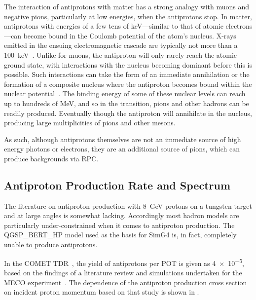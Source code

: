 %
The interaction of antiprotons with matter has a strong analogy with muons and negative pions, particularly at low energies, when the antiprotons stop.
In matter, antiprotons with energies of a few tens of keV---similar to that of atomic electrons---can become bound in the Coulomb potential of the atom's nucleus.
X-rays emitted in the ensuing electromagnetic cascade are typically not more than a 100~keV~\cite{Aramaki201352}.
Unlike for muons, the antiproton will only rarely reach the atomic ground state, with interactions with the nucleus becoming dominant before this is possible.
Such interactions can take the form of an immediate annihilation or the formation of a composite nucleus where the antiproton becomes bound within the nuclear potential~\cite{Wong:1984fy,Mishustin:2004xa}.
The binding energy of some of these nuclear levels can reach up to hundreds of MeV, and so in the transition, pions and other hadrons can be readily produced.
Eventually though the antiproton will annihilate in the nucleus, producing large multiplicities of pions and other mesons.

As such, although antiprotons themselves are not an immediate source of high energy photons or electrons, they are an additional source of pions, which can produce backgrounds via \acf{RPC}.

\subsection{Antiproton Production Rate and Spectrum}
The literature on antiproton production with 8~GeV protons on a tungsten target and at large angles is somewhat lacking.
Accordingly most hadron models are particularly under-constrained when it comes to antiproton production.
The QGSP_BERT_HP model used as the basis for SimG4 is, in fact, completely unable to produce antiprotons.

\FigAntiprotonMeco
In the COMET TDR~\cite{TDR2016}, the yield of antiprotons per \ac{POT} is given as \num{4e-5}, based on the findings of a literature review and simulations undertaken for the MECO experiment~\cite{Meco024}.
The dependence of the antiproton production cross section on incident proton momentum based on that study is shown in .

